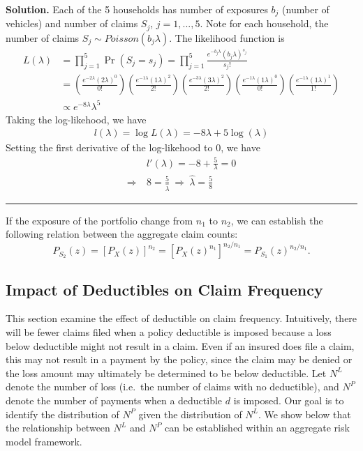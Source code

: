 \documentclass[]{book}
\theoremstyle{definition}
\theoremstyle{definition}
\theoremstyle{definition}
\theoremstyle{remark}
\begin{document}
\hypertarget{toggleExampleAggLoss.5.1}{}
\textbf{Solution.} Each of the 5 households has number of exposures
\(b_j\) (number of vehicles) and number of claims \(S_j\),
\(j=1,...,5\). Note for each household, the number of claims
\(S_j \sim Poisson (b_j \lambda)\). The likelihood function is\\
\[\begin{aligned}
L(\lambda) &= \prod_{j=1}^5 \Pr(S_j=s_j) = \prod_{j=1}^5 \frac{e^{-b_j\lambda} (b_j \lambda)^{s_j}}{s_j!} \\
&= \left(\frac{e^{-2\lambda} (2 \lambda)^{0}}{0!} \right)
\left(\frac{e^{-1\lambda} (1 \lambda)^{2}}{2!} \right)
\left(\frac{e^{-3\lambda} (3 \lambda)^{2}}{2!} \right)
\left(\frac{e^{-1\lambda} (1 \lambda)^{0}}{0!} \right)
\left(\frac{e^{-1\lambda} (1 \lambda)^{1}}{1!} \right) \\
&\propto e^{-8\lambda} \lambda^5
\end{aligned}\] Taking the log-likehood, we have \[\begin{aligned}
l(\lambda) = \log L(\lambda) = -8\lambda + 5\log(\lambda)
\end{aligned}\] Setting the first derivative of the log-likehood to 0,
we have \[\begin{aligned}
&l'(\lambda) = -8 + \frac{5}{\lambda} = 0 \\
\Rightarrow \ & 8 = \frac{5}{\hat{\lambda}} \ \Rightarrow \ \hat{\lambda} = \frac{5}{8}
\end{aligned}\]

\begin{center}\rule{0.5\linewidth}{\linethickness}\end{center}

If the exposure of the portfolio change from \(n_1\) to \(n_2\), we can
establish the following relation between the aggregate claim counts:
\[P_{S_2}(z)=[P_X(z)]^{n_2}=[P_X(z)^{n_1}]^{n_2/n_1}=P_{S_1}(z)^{n_2/n_1}.\]

\subsection{Impact of Deductibles on Claim
Frequency}\label{impact-of-deductibles-on-claim-frequency}

This section examine the effect of deductible on claim frequency.
Intuitively, there will be fewer claims filed when a policy deductible
is imposed because a loss below deductible might not result in a claim.
Even if an insured does file a claim, this may not result in a payment
by the policy, since the claim may be denied or the loss amount may
ultimately be determined to be below deductible. Let \(N^L\) denote the
number of loss (i.e.~the number of claims with no deductible), and
\(N^P\) denote the number of payments when a deductible \(d\) is
imposed. Our goal is to identify the distribution of \(N^P\) given the
distribution of \(N^L\). We show below that the relationship between
\(N^L\) and \(N^P\) can be established within an aggregate risk model
framework.
\end{document}
